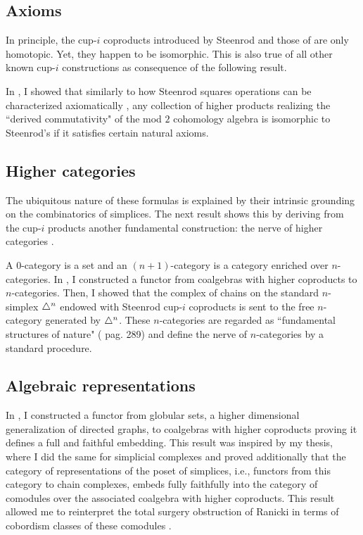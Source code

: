 \subsection{Axioms}

In principle, the cup-$i$ coproducts introduced by Steenrod \cite{steenrod1947products} and those of \cite{medina2021newformulas} are only homotopic.
Yet, they happen to be isomorphic.
This is also true of all other known cup-$i$ constructions \cite{gonzalez-diaz1999steenrod, mcclure2003multivariable, berger2004combinatorial, medina2020prop1} as consequence of the following result.

In \cite{medina2018axiomatic}, I showed that similarly to how Steenrod squares operations can be characterized axiomatically \cite{steenrod1962cohomology}, any collection of higher products realizing the ``derived commutativity" of the mod $2$ cohomology algebra is isomorphic to Steenrod's if it satisfies certain natural axioms.

\subsection{Higher categories}

The ubiquitous nature of these formulas is explained by their intrinsic grounding on the combinatorics of simplices.
The next result shows this by deriving from the cup-$i$ products another fundamental construction: the nerve of higher categories \cite{street1987orientals}.

A $0$-category is a set and an $(n+1)$-category is a category enriched over $n$-categories.
In \cite{medina2020globular}, I constructed a functor from coalgebras with higher coproducts to $n$-categories.
Then, I showed that the complex of chains on the standard $n$-simplex $\triangle^n$ endowed with Steenrod cup-$i$ coproducts is sent to the free $n$-category generated by $\triangle^n$.
These $n$-categories are regarded as ``fundamental structures of nature" (\cite{street1987orientals} pag. 289) and define the nerve of $n$-categories by a standard procedure.

\subsection{Algebraic representations}

In \cite{medina2020globular}, I constructed a functor from globular sets, a higher dimensional generalization of directed graphs, to coalgebras with higher coproducts proving it defines a full and faithful embedding.
This result was inspired by my thesis, where I did the same for simplicial complexes and proved additionally that the category of representations of the poset of simplices, i.e., functors from this category to chain complexes, embeds fully faithfully into the category of comodules over the associated coalgebra with higher coproducts.
This result allowed me to reinterpret the total surgery obstruction of Ranicki \cite{ranicki1992topological} in terms of cobordism classes of these comodules \cite{medina2015thesis}.

